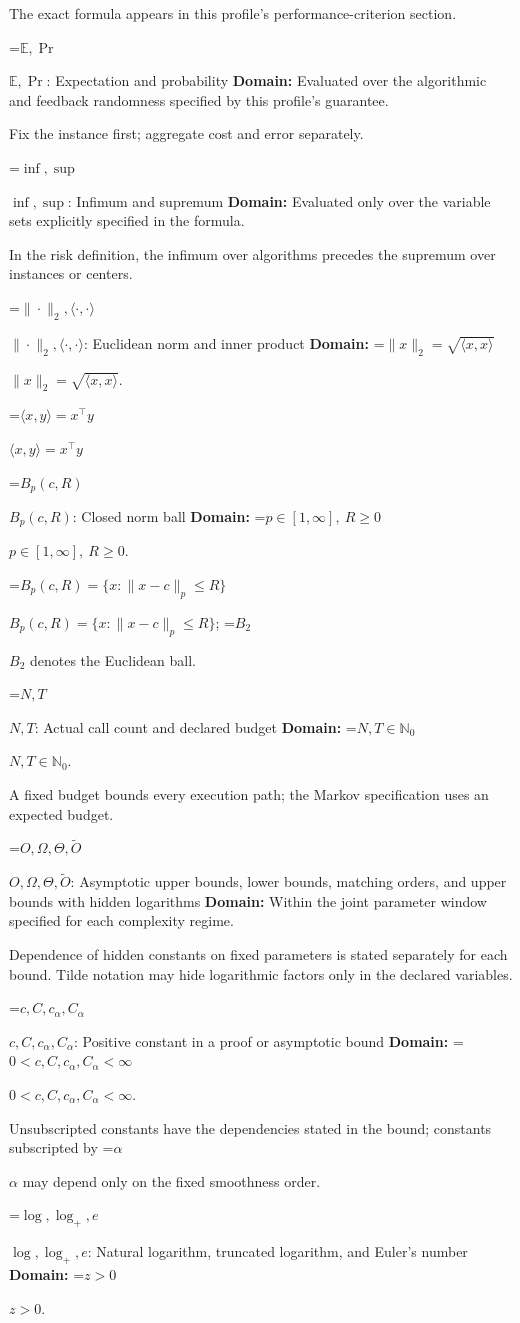 \documentclass[10pt,a4paper]{article}
\newcommand{\AtlasMath}[1]{\par\begingroup\centering\setbox0=\hbox{$\displaystyle #1$}\ifdim\wd0>1.4\linewidth\typeout{ATLAS WIDE FORMULA: \the\wd0}\fi\ifdim\wd0>\linewidth\resizebox{\linewidth}{!}{\box0}\else\box0\fi\par\endgroup}
\newcommand{\AtlasInlineMath}[1]{\begingroup\setbox0=\hbox{$#1$}\ifdim\wd0>.4\linewidth\endgroup\AtlasMath{#1}\else\endgroup$#1$\fi}
\begin{document}
The exact formula appears in this profile's performance-criterion section.

\AtlasInlineMath{\mathbb{E},\Pr}: Expectation and probability \textbf{Domain:} Evaluated over the algorithmic and feedback randomness specified by this profile's guarantee.

Fix the instance first; aggregate cost and error separately.

\AtlasInlineMath{\inf,\sup}: Infimum and supremum \textbf{Domain:} Evaluated only over the variable sets explicitly specified in the formula.

In the risk definition, the infimum over algorithms precedes the supremum over instances or centers.

\AtlasInlineMath{\|\cdot\|_2,\langle\cdot,\cdot\rangle}: Euclidean norm and inner product \textbf{Domain:} \AtlasInlineMath{\|x\|_2=\sqrt{\langle x,x\rangle}}.

\AtlasInlineMath{\langle x,y\rangle=x^\top y}

\AtlasInlineMath{B_p(c,R)}: Closed norm ball \textbf{Domain:} \AtlasInlineMath{p\in[1,\infty],\ R\ge0}.

\AtlasInlineMath{B_p(c,R)=\{x:\|x-c\|_p\le R\}}; \AtlasInlineMath{B_2} denotes the Euclidean ball.

\AtlasInlineMath{N,T}: Actual call count and declared budget \textbf{Domain:} \AtlasInlineMath{N,T\in\mathbb{N}_0}.

A fixed budget bounds every execution path; the Markov specification uses an expected budget.

\AtlasInlineMath{O,\Omega,\Theta,\widetilde{O}}: Asymptotic upper bounds, lower bounds, matching orders, and upper bounds with hidden logarithms \textbf{Domain:} Within the joint parameter window specified for each complexity regime.

Dependence of hidden constants on fixed parameters is stated separately for each bound. Tilde notation may hide logarithmic factors only in the declared variables.

\AtlasInlineMath{c,C,c_\alpha,C_\alpha}: Positive constant in a proof or asymptotic bound \textbf{Domain:} \AtlasInlineMath{0<c,C,c_\alpha,C_\alpha<\infty}.

Unsubscripted constants have the dependencies stated in the bound; constants subscripted by \AtlasInlineMath{\alpha} may depend only on the fixed smoothness order.

\AtlasInlineMath{\log,\log_+,e}: Natural logarithm, truncated logarithm, and Euler's number \textbf{Domain:} \AtlasInlineMath{z>0}.
\end{document}
